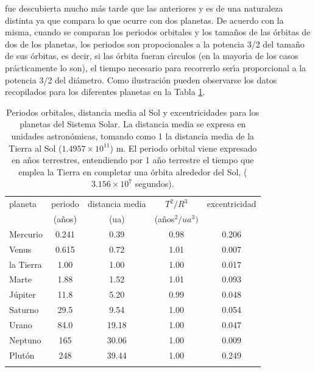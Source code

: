 fue descubierta mucho m\'as tarde que las anteriores y es de una naturaleza distinta ya que compara lo que ocurre con dos planetas. De acuerdo con la misma, cuando se comparan los periodos orbitales y los tama\~{n}os de las \'orbitas de dos de los planetas, los periodos son propocionales a la potencia 3/2 del tama\~{n}o de sus \'orbitas, es decir, si las \'orbita fueran c\'\i{}rculos (en la mayor\'\i{}a de los casos pr\'acticamente lo son), el tiempo necesario para recorrerlo ser\'\i{}a proporcional a la potencia 3/2 del di\'ametro. Como ilustraci\'on pueden observarse los datos recopilados para los diferentes planetas en la Tabla \ref{tab:tercera_ley_kepler}.


\bigskip
\begin{table}[h]
\begin{center}
\footnotesize
\begin{tabular}{lcccc}
\toprule
planeta 	& periodo 		& distancia media & $ T^{2}/R^{3}$ & excentricidad \\
			&   (a\~{n}os)  &  (ua)           & (a\~{n}os$^{2}/ua^{3})$& \\
\midrule
Mercurio 	& 0.241 		& 0.39	 		  & 0.98 	&0.206\\
Venus 		& 0.615 		& 0.72			  & 1.01	&0.007\\
la Tierra   & 1.00   		& 1.00			  & 1.00	&0.017\\
Marte     	& 1.88  		& 1.52			  & 1.01	&0.093\\
J\'upiter   & 11.8   		& 5.20			  & 0.99	&0.048\\
Saturno    	& 29.5  		& 9.54			  & 1.00	&0.054\\
Urano   	& 84.0   		& 19.18			  & 1.00	&0.047\\
Neptuno  	& 165   		& 30.06			  & 1.00	&0.009\\
Plut\'on   	& 248   		& 39.44			  & 1.00	&0.249\\
\addlinespace
\bottomrule
\end{tabular}
\end{center}
\caption{Periodos orbitales, distancia media al Sol y excentricidades para los planetas del Sistema Solar. La distancia media se expresa en unidades astron\'omicas, tomando como 1 la distancia media de la Tierra al Sol ($1.4957  \times 10^{11}$) m. El periodo orbital viene expresado en a\~{n}os terrestres, entendiendo por 1 a\~{n}o terrestre el tiempo que emplea la Tierra en completar una \'orbita alrededor del Sol, ($3.156 \times 10^7$ segundos).}
  \label{tab:tercera_ley_kepler}
\end{table}


